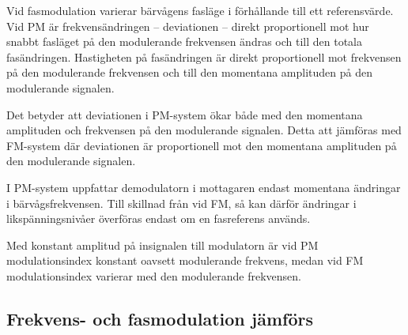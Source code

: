Vid fasmodulation varierar bärvågens fasläge i förhållande till ett
referensvärde.
Vid PM är frekvensändringen -- deviationen -- direkt proportionell mot hur
snabbt fasläget på den modulerande frekvensen ändras och till den totala
fasändringen.
Hastigheten på fasändringen är direkt proportionell mot frekvensen på den
modulerande frekvensen och till den momentana amplituden på den modulerande
signalen.

Det betyder att deviationen i PM-system ökar både med den momentana amplituden
och frekvensen på den modulerande signalen.
Detta att jämföras med FM-system där deviationen är proportionell mot den
momentana amplituden på den modulerande signalen.

I PM-system uppfattar demodulatorn i mottagaren endast momentana ändringar i
bärvågsfrekvensen.
Till skillnad från vid FM, så kan därför ändringar i likspänningsnivåer
överföras endast om en fasreferens används.

Med konstant amplitud på insignalen till modulatorn är vid PM
modulationsindex konstant oavsett modulerande frekvens, medan vid FM
modulationsindex varierar med den modulerande frekvensen.

\subsection{Frekvens- och fasmodulation jämförs}

